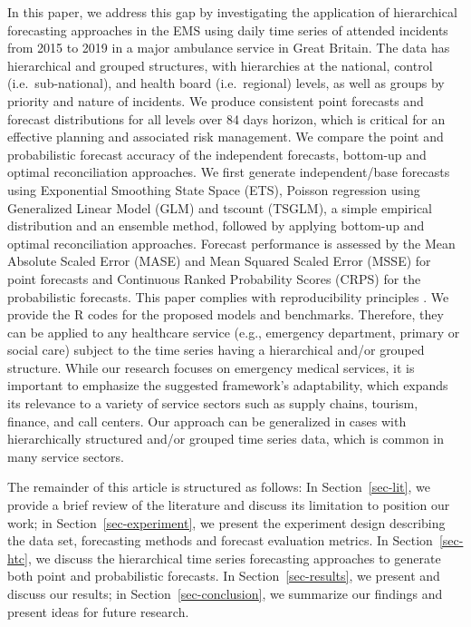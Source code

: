 \documentclass[
  authoryear,
  preprint,
  3p]{elsarticle}
\begin{document}
In this paper, we address this gap by investigating the application of
hierarchical forecasting approaches in the EMS using daily time series
of attended incidents from 2015 to 2019 in a major ambulance service in
Great Britain. The data has hierarchical and grouped structures, with
hierarchies at the national, control (i.e.~sub-national), and health
board (i.e.~regional) levels, as well as groups by priority and nature
of incidents. We produce consistent point forecasts and forecast
distributions for all levels over 84 days horizon, which is critical for
an effective planning and associated risk management. We compare the
point and probabilistic forecast accuracy of the independent forecasts,
bottom-up and optimal reconciliation approaches. We first generate
independent/base forecasts using Exponential Smoothing State Space
(ETS), Poisson regression using Generalized Linear Model (GLM) and
tscount (TSGLM), a simple empirical distribution and an ensemble method,
followed by applying bottom-up and optimal reconciliation approaches.
Forecast performance is assessed by the Mean Absolute Scaled Error
(MASE) and Mean Squared Scaled Error (MSSE) for point forecasts and
Continuous Ranked Probability Scores (CRPS) for the probabilistic
forecasts. This paper complies with reproducibility principles
\citep{stodden2013best, boylan2015reproducibility}. We provide the R
codes for the proposed models and benchmarks. Therefore, they can be
applied to any healthcare service (e.g., emergency department, primary
or social care) subject to the time series having a hierarchical and/or
grouped structure. While our research focuses on emergency medical
services, it is important to emphasize the suggested framework's
adaptability, which expands its relevance to a variety of service
sectors such as supply chains, tourism, finance, and call centers. Our
approach can be generalized in cases with hierarchically structured
and/or grouped time series data, which is common in many service
sectors.

The remainder of this article is structured as follows: In
Section~\ref{sec-lit}, we provide a brief review of the literature and
discuss its limitation to position our work; in
Section~\ref{sec-experiment}, we present the experiment design
describing the data set, forecasting methods and forecast evaluation
metrics. In Section~\ref{sec-htc}, we discuss the hierarchical time
series forecasting approaches to generate both point and probabilistic
forecasts. In Section~\ref{sec-results}, we present and discuss our
results; in Section~\ref{sec-conclusion}, we summarize our findings and
present ideas for future research.
\end{document}
